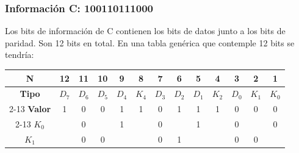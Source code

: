 \subsubsection{Información C: 100110111000}
\sangria{} Los bits de información de C contienen los bits de datos junto a los bits de paridad. Son 12 bits en total. En una tabla genérica que contemple 12 bits se tendría:
\begin{center}
\begin{tabular}{ccccccccccccc}
\rowcolor[HTML]{FFFFC7} 
\cellcolor[HTML]{FCFF2F}\textbf{N}     & 12                        & 11                        & 10                        & 9                         & 8                         & 7                         & 6                         & 5                         & 4                         & 3                         & 2                         & 1                         \\ \hline
\rowcolor[HTML]{CBCEFB} 
\cellcolor[HTML]{9698ED}\textbf{Tipo}  & $D_7$                     & $D_6$                     & $D_5$                     & $D_4$                     & $K_4$                     & $D_3$                     & $D_2$                     & $D_1$                     & $K_2$                     & $D_0$                     & $K_1$                     & $K_0$                     \\ \cline{2-13} 
\rowcolor[HTML]{FFCCC9} 
\cellcolor[HTML]{FD6864}\textbf{Valor} & 1                         & 0                         & 0                         & 1                         & 1                         & 0                         & 1                         & 1                         & 1                         & 0                         & 0                         & 0                         \\ \cline{2-13} 
\cellcolor[HTML]{9AFF99}$K_0$          &                           & \cellcolor[HTML]{96FFFB}0 &                           & \cellcolor[HTML]{96FFFB}1 &                           & \cellcolor[HTML]{96FFFB}0 &                           & \cellcolor[HTML]{96FFFB}1 &                           & \cellcolor[HTML]{96FFFB}0 &                           & \cellcolor[HTML]{96FFFB}0 \\
\cellcolor[HTML]{9AFF99}$K_1$          &                           & \cellcolor[HTML]{96FFFB}0 & \cellcolor[HTML]{96FFFB}0 &                           &                           & \cellcolor[HTML]{96FFFB}0 & \cellcolor[HTML]{96FFFB}1 &                           &                           & \cellcolor[HTML]{96FFFB}0 & \cellcolor[HTML]{96FFFB}0 &                           \\

\end{tabular}
\end{center}
